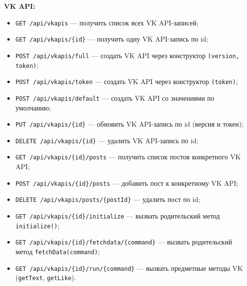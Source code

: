 \documentclass[11pt,a4paper]{article}
\begin{document}
\textbf{VK API:}
\begin{itemize}
    \item \texttt{GET /api/vkapis} --- получить список всех VK API-записей;
    \item \texttt{GET /api/vkapis/\{id\}} --- получить одну VK API-запись по id;
    \item \texttt{POST /api/vkapis/full} --- создать VK API через конструктор \texttt{(version, token)};
    \item \texttt{POST /api/vkapis/token} --- создать VK API через конструктор \texttt{(token)};
    \item \texttt{POST /api/vkapis/default} --- создать VK API со значениями по умолчанию;
    \item \texttt{PUT /api/vkapis/\{id\}} --- обновить VK API-запись по id (версия и токен);
    \item \texttt{DELETE /api/vkapis/\{id\}} --- удалить VK API-запись по id;
    \item \texttt{GET /api/vkapis/\{id\}/posts} --- получить список постов конкретного VK API;
    \item \texttt{POST /api/vkapis/\{id\}/posts} --- добавить пост к конкретному VK API;
    \item \texttt{DELETE /api/vkapis/posts/\{postId\}} --- удалить пост по id;
    \item \texttt{GET /api/vkapis/\{id\}/initialize} --- вызвать родительский метод \texttt{initialize()};
    \item \texttt{GET /api/vkapis/\{id\}/fetchdata/\{command\}} --- вызвать родительский метод \texttt{fetchData(command)};
    \item \texttt{GET /api/vkapis/\{id\}/run/\{command\}} --- вызвать предметные методы VK (\texttt{getText}, \texttt{getLike}).
\end{itemize}
\end{document}
